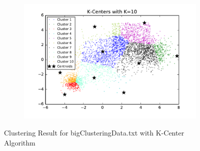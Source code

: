 \begin{figure}[htb]
\begin{subfigure}[b]{0.475\textwidth}
            \includegraphics[width=\textwidth]{./figures/bigClustering_kCenter_10.pdf}
        \end{subfigure}
        
        \caption{Clustering Result for bigClusteringData.txt with K-Center Algorithm}
        \label{fig:kmean_clustering}
\end{figure}

